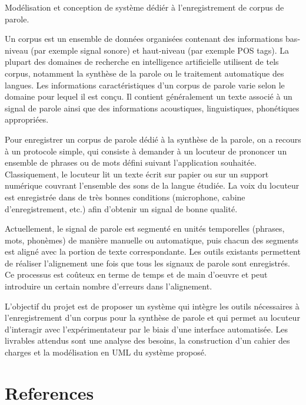\documentclass[a4paper]{article}
\begin{document}

\Large
 \begin{center}
Modélisation et conception de syst\`eme d\'edi\'er \`a l'enregistrement de corpus de parole.
\end{center}

\hspace{10pt}


\normalsize
Un corpus est un ensemble de données organisées contenant des informations bas-niveau (par exemple signal sonore) et haut-niveau (par exemple POS tags). La plupart des domaines de recherche en intelligence artificielle utilisent de tels corpus, notamment la synthèse de la parole ou le traitement automatique des langues. Les informations caractéristiques d'un corpus de parole varie selon le domaine pour lequel il est conçu. Il contient généralement un texte associé à un signal de parole ainsi que des informations acoustiques, linguistiques, phonétiques appropriées.


Pour enregistrer un corpus de parole dédié à la synthèse de la parole, on a recours à un protocole simple, qui consiste à demander à un locuteur de prononcer un ensemble de phrases ou de mots défini suivant l'application souhaitée. Classiquement, le locuteur lit un texte écrit sur papier ou sur un support numérique couvrant l'ensemble des sons de la langue étudiée. La voix du locuteur est enregistrée dans de très bonnes conditions (microphone, cabine d'enregistrement, etc.) afin d'obtenir un signal de bonne qualité.

Actuellement, le signal de parole est segmenté en unités temporelles (phrases, mots, phonèmes) de manière manuelle ou automatique, puis chacun des segments est aligné avec la portion de texte correspondante. Les outils existants permettent de réaliser l'alignement une fois que tous les signaux de parole sont enregistrés. Ce processus est coûteux en terme de temps et de main d'oeuvre et peut introduire un certain nombre d'erreurs dans l'alignement.


L'objectif du projet est de proposer un système qui intègre les outils nécessaires à l'enregistrement d'un corpus pour la synthèse de parole et qui permet au locuteur d'interagir avec l'expérimentateur par le biais d'une interface automatisée. Les livrables attendus sont une analyse des besoins, la construction d'un cahier des charges et la modélisation en UML du système proposé.
 
\section*{References}	


 
\end{document}
